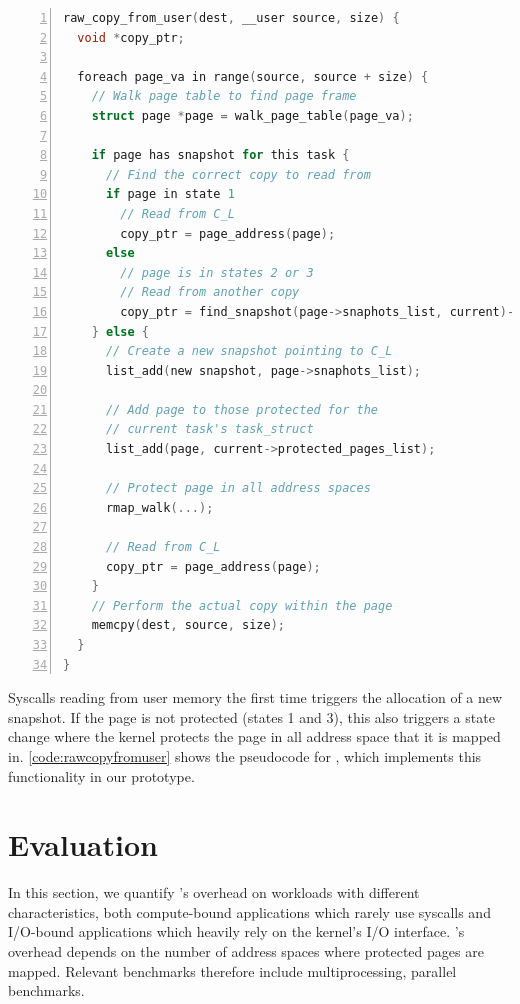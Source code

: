 \documentclass[letterpaper,twocolumn,10pt, anonymous]{article}
\begin{document}
\begin{minipage}{\linewidth}
\begin{lstlisting}[language=C, 
  caption={Pseudo-code for kernel copy from user memory},
  label=code:rawcopyfromuser,  breaklines=true, captionpos=b,
  postbreak=\mbox{\textcolor{red}{$\hookrightarrow$}\space},
  numbers=left,basicstyle=\scriptsize, xleftmargin=5.0ex]
raw_copy_from_user(dest, __user source, size) {
  void *copy_ptr;

  foreach page_va in range(source, source + size) {
    // Walk page table to find page frame
    struct page *page = walk_page_table(page_va);

    if page has snapshot for this task { 
      // Find the correct copy to read from
      if page in state 1
        // Read from C_L
        copy_ptr = page_address(page); 
      else 
        // page is in states 2 or 3
        // Read from another copy
        copy_ptr = find_snapshot(page->snaphots_list, current)->copy;
    } else {                             
      // Create a new snapshot pointing to C_L
      list_add(new snapshot, page->snaphots_list);

      // Add page to those protected for the 
      // current task's task_struct
      list_add(page, current->protected_pages_list);

      // Protect page in all address spaces
      rmap_walk(...);

      // Read from C_L
      copy_ptr = page_address(page);     
    } 
    // Perform the actual copy within the page
    memcpy(dest, source, size);
  }
}
\end{lstlisting}
\end{minipage}

Syscalls reading from user memory the first time triggers the 
allocation of a new snapshot. 
If the page is not protected (states 1 and 3), this also 
triggers a state change where the kernel protects the page
in all address space that it is mapped in. 
\autoref{code:rawcopyfromuser} shows the pseudocode for 
, which implements this functionality
in our prototype.

\section{Evaluation}

In this section, we quantify \tiktok's overhead on workloads 
with different characteristics, both compute-bound applications
which rarely use syscalls and I/O-bound applications which 
heavily rely on the kernel's I/O interface.
\tiktok's overhead depends on the number of address spaces 
where protected pages are mapped. 
Relevant benchmarks therefore include multiprocessing, parallel 
benchmarks.
\end{document}
